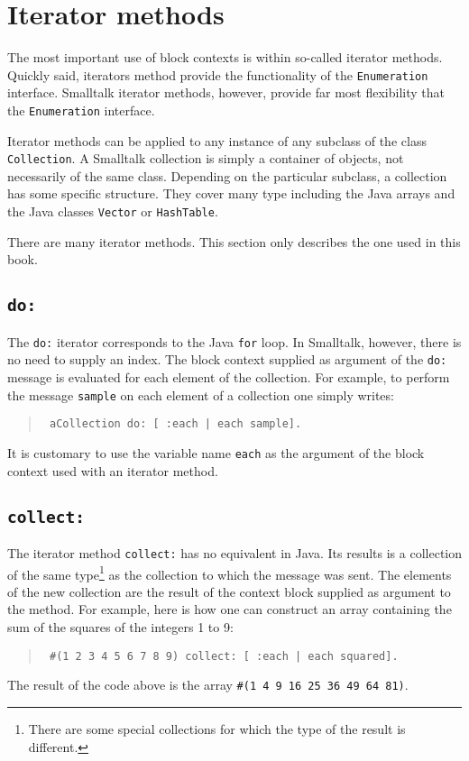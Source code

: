\documentclass[twoside]{book}
\begin{document}
\section{Iterator methods}
\label{sec:iterator} The most important use of block contexts is
within so-called iterator methods. Quickly said, iterators method
provide the functionality of the {\tt Enumeration} interface.
Smalltalk iterator methods, however, provide far most flexibility
that the {\tt Enumeration} interface.

Iterator methods can be applied to any instance of any subclass of
the class {\tt Collection}. A Smalltalk collection is simply a
container of objects, not necessarily of the same class. Depending
on the particular subclass, a collection has some specific
structure. They cover many type including the Java arrays and the
Java classes {\tt Vector} or {\tt HashTable}.

There are many iterator methods. This section only describes the
one used in this book.

\subsection{\tt do:}
The {\tt do:} iterator corresponds to the Java {\tt for} loop. In
Smalltalk, however, there is no need to supply an index. The block
context supplied as argument of the {\tt do:} message is evaluated
for each element of the collection. For example, to perform the
message {\tt sample} on each element of a collection one simply
writes:
\begin{quote}
\begin{verbatim}
 aCollection do: [ :each | each sample].
\end{verbatim}
\end{quote}
It is customary to use the variable name {\tt each} as the
argument of the block context used with an iterator method.

\subsection{\tt collect:}
\label{sec:collect} The iterator method {\tt collect:} has no
equivalent in Java. Its results is a collection of the same
type\footnote{There are some special collections for which the
type of the result is different.} as the collection to which the
message was sent. The elements of the new collection are the
result of the context block supplied as argument to the method.
For example, here is how one can construct an array containing the
sum of the squares of the integers 1 to 9:
\begin{quote}
\begin{verbatim}
 #(1 2 3 4 5 6 7 8 9) collect: [ :each | each squared].
\end{verbatim}
\end{quote}
The result of the code above is the array {\tt \#(1 4 9 16 25 36
49 64 81)}.
\end{document}
